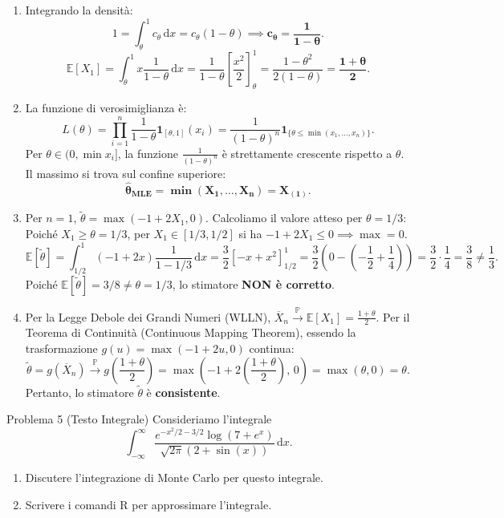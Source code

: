 \documentclass[11pt,a4paper]{article}
\newcommand{\EE}{\mathbb{E}}
\newcommand{\Prob}{\mathbb{P}}
\newcommand{\dx}{\mathrm{d}x}
\begin{document}
\begin{soluzionebox}
\begin{enumerate}[label=(\alph*)]
    \item Integrando la densità:
    \[
    1 = \int_\theta^1 c_\theta \, \dx = c_\theta (1 - \theta) \implies \mathbf{c_\theta = \frac{1}{1-\theta}}.
    \]
    \[
    \EE[X_1] = \int_\theta^1 x \frac{1}{1-\theta} \, \dx = \frac{1}{1-\theta} \left[ \frac{x^2}{2} \right]_\theta^1 = \frac{1 - \theta^2}{2(1-\theta)} = \mathbf{\frac{1+\theta}{2}}.
    \]

    \item La funzione di verosimiglianza è:
    \[
    L(\theta) = \prod_{i=1}^n \frac{1}{1-\theta} \mathbf{1}_{[\theta, 1]}(x_i) = \frac{1}{(1-\theta)^n} \mathbf{1}_{\{\theta \le \min(x_1,\dots,x_n)\}}.
    \]
    Per $\theta \in (0, \min x_i]$, la funzione $\frac{1}{(1-\theta)^n}$ è strettamente crescente rispetto a $\theta$. Il massimo si trova sul confine superiore:
    \[
    \mathbf{\widehat{\theta}_{\text{MLE}} = \min(X_1, \dots, X_n) = X_{(1)}}.
    \]

    \item Per $n=1$, $\widetilde{\theta} = \max(-1 + 2X_1, 0)$.
    Calcoliamo il valore atteso per $\theta = 1/3$:
    Poiché $X_1 \ge \theta = 1/3$, per $X_1 \in [1/3, 1/2]$ si ha $-1+2X_1 \le 0 \implies \max = 0$.
    \[
    \EE[\widetilde{\theta}] = \int_{1/2}^1 (-1 + 2x) \frac{1}{1 - 1/3} \, \dx = \frac{3}{2} \left[ -x + x^2 \right]_{1/2}^1 = \frac{3}{2} \left( 0 - \left(-\frac{1}{2} + \frac{1}{4}\right) \right) = \frac{3}{2} \cdot \frac{1}{4} = \frac{3}{8} \neq \frac{1}{3}.
    \]
    Poiché $\EE[\widetilde{\theta}] = 3/8 \neq \theta = 1/3$, lo stimatore \textbf{NON è corretto}.

    \item Per la Legge Debole dei Grandi Numeri (WLLN), $\overline{X}_n \xrightarrow{\Prob} \EE[X_1] = \frac{1+\theta}{2}$.
    Per il Teorema di Continuità (Continuous Mapping Theorem), essendo la trasformazione $g(u) = \max(-1 + 2u, 0)$ continua:
    \[
    \widetilde{\theta} = g(\overline{X}_n) \xrightarrow{\Prob} g\left(\frac{1+\theta}{2}\right) = \max\left(-1 + 2\left(\frac{1+\theta}{2}\right), \, 0\right) = \max(\theta, 0) = \theta.
    \]
    Pertanto, lo stimatore $\widetilde{\theta}$ è \textbf{consistente}.
\end{enumerate}
\end{soluzionebox}

\begin{problemabox}{Problema 5 (Testo Integrale)}
Consideriamo l'integrale
\[
\int_{-\infty}^\infty \frac{e^{-x^2/2 - 3/2}\log(7 + e^x)}{\sqrt{2\pi}(2 + \sin(x))} \, \dx.
\]
\begin{enumerate}[label=(\alph*)]
    \item Discutere l'integrazione di Monte Carlo per questo integrale.
    \item Scrivere i comandi R per approssimare l'integrale.
\end{enumerate}
\end{problemabox}
\end{document}
